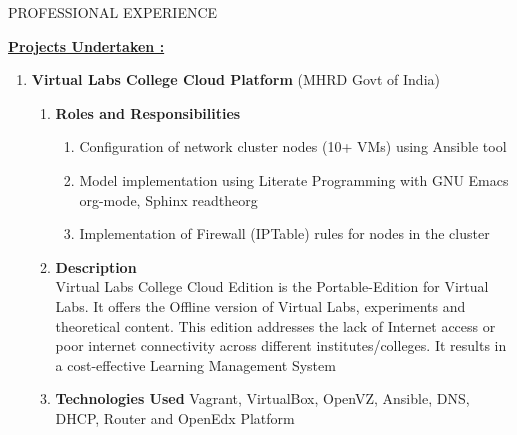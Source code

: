 \documentclass{resume} %
\newcommand{\blank}[1]{\hspace*{#1}}
\begin{document}
\begin{rSection}{PROFESSIONAL EXPERIENCE}
\begin{rSubsection}






\uline {\textbf{Projects Undertaken :}}
\sectionlineskip

\begin{enumerate}[label=\bfseries\arabic*]
\item \textbf {Virtual Labs College Cloud Platform} (MHRD Govt of India)
  \begin{enumerate}
    
  \item \textbf{Roles and Responsibilities }
    \begin{enumerate}
    \item Configuration of network cluster nodes (10+
      VMs) using Ansible tool
    \item Model implementation using Literate Programming with GNU Emacs
      org-mode, Sphinx readtheorg
    \item Implementation of Firewall (IPTable) rules for nodes in the
      cluster
    \end{enumerate}
    
  \item \textbf{Description } \\ \blank{2 cm} Virtual Labs College
    Cloud Edition is the Portable-Edition for Virtual Labs. It offers
    the Offline version of Virtual Labs, experiments and theoretical
    content. This edition addresses the lack of Internet access or
    poor internet connectivity across different
    institutes/colleges. It results in a cost-effective Learning
    Management System
    
  \item \textbf{Technologies Used } Vagrant, VirtualBox, OpenVZ,
    Ansible, DNS, DHCP, Router and OpenEdx Platform
  \end{enumerate}


\end{enumerate}
\end{rSubsection}
\end{rSection}
\end{document}
